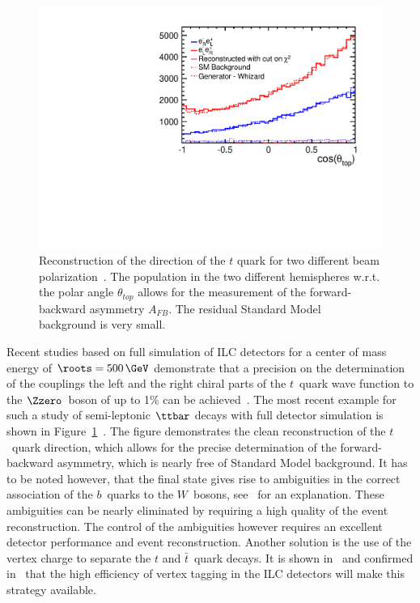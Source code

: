 \begin{figure}
\centering
\includegraphics[width=0.7\columnwidth]{AFB_wbkg_chi2cut.pdf}
\caption{Reconstruction of the direction of the $t$ quark for two 
different beam polarization~\cite{Amjad:2013hca}. The population in the two different 
hemispheres w.r.t. the polar angle $\theta_{top}$ allows for the measurement of the forward-backward asymmetry $A_{FB}$. 
The residual Standard Model background is very small.}
\label{fig:topangle}
\end{figure}

Recent studies based on full simulation of ILC detectors for a center of mass
 energy of $\roots=500\,\GeV$ demonstrate that a precision on the 
determination of the couplings the left and the right chiral parts of 
the $t$~quark wave function to the $\Zzero$~boson of up to 1\% can be 
achieved~\cite{ild:bib:benchmark:doublet,Devetak:2010na,Doublet:2012wf}. The most recent example for such a study of semi-leptonic $\ttbar$ decays with full detector simulation is shown in Figure~\ref{fig:topangle}~\cite{Amjad:2013hca}.
The figure demonstrates the clean reconstruction of the $t$~quark direction, which allows for the precise determination of the 
forward-backward asymmetry, which is nearly free of Standard Model background.   It has to be noted however, that the final state gives rise to ambiguities in the correct association 
of the $b$~quarks to the $W$~bosons, see~\cite{Amjad:2013hca} for an explanation. These ambiguities can be nearly eliminated by requiring 
a high quality of the event reconstruction. The control of the ambiguities however requires an excellent detector performance and event reconstruction.
Another solution is the use of the vertex charge to separate the $t$ and $\bar t$~quark decays. It is shown in~\cite{Devetak:2010na} and confirmed in~\cite{bib:ilc-tdr-dbd} that the high efficiency of vertex tagging in the ILC detectors will make this strategy available. 


